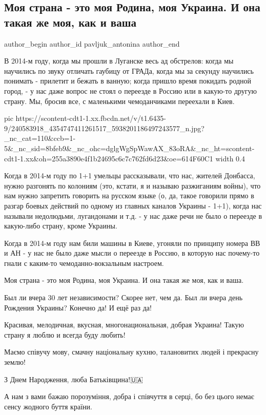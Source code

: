  
 
 
 
 
 
\subsection{Моя страна - это моя Родина, моя Украина. И она такая же моя, как и ваша}
\label{sec:25_08_2021.fb.pavljuk_antonina.1.moja_rodina_ukraina}
 
\ifcmt
 author_begin
   author_id pavljuk_antonina
 author_end
\fi

В 2014-м году, когда мы прошли в Луганске весь ад обстрелов: когда мы научились
по звуку отличать гаубицу от ГРАДа, когда мы за секунду научились понимать -
прилетит и бежать в ванную; когда пришло время покидать родной город, - у нас
даже вопрос не стоял о переезде в Россию или в какую-то другую страну. Мы,
бросив все, с маленькими чемоданчиками переехали в Киев.

\ifcmt
  pic https://scontent-cdt1-1.xx.fbcdn.net/v/t1.6435-9/240583918_4354747411261517_5938201186497243577_n.jpg?_nc_cat=110&ccb=1-5&_nc_sid=8bfeb9&_nc_ohc=dglgWgSpWawAX_83oRA&_nc_ht=scontent-cdt1-1.xx&oh=255a3890e4f1b24695c6c7c762fd6d23&oe=614F60C1
  width 0.4
\fi

Когда в 2014-м году по 1+1 умельцы рассказывали, что нас, жителей Донбасса,
нужно разгонять по колониям (это, кстати, я и называю разжиганиям войны), что
нам нужно запретить говорить на русском языке (о, да, такое говорили прямо в
разгар боевых действий по одному из главных каналов Украины - 1+1), когда нас
называли недолюдьми, лугандонами и т.д. - у нас даже речи не было о переезде в
какую-либо страну, кроме Украины.

Когда в 2014-м году нам били машины в Киеве, угоняли по принципу номера ВВ и АН
- у нас не было даже мысли о переезде в Россию, в которую нас почему-то гнали с
каким-то чемоданно-вокзальным настроем.

Моя страна - это моя Родина, моя Украина. И она такая же моя, как и ваша. 

Был ли вчера 30 лет независимости? Скорее нет, чем да. Был ли вчера день
Рождения Украины? Конечно да! И ещё раз да!

Красивая, мелодичная, вкусная, многонациональная, добрая Украина! Такую страну
я люблю и всегда буду любить! 

Маємо співучу мову, смачну національну кухню, талановитих людей і прекрасну
землю! 

З Днем Народження, люба Батьківщина!🇺🇦

А нам з вами бажаю порозуміння, добра і співчуття в серці, бо без цього немає
сенсу жодного буття країни.
